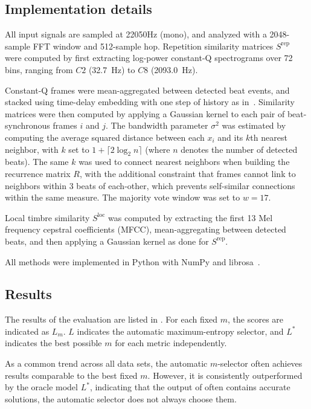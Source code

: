 \documentclass{article}
\begin{document}
\subsection{Implementation details}
All input signals are sampled at 22050Hz (mono), and analyzed with a 2048-sample FFT window
and 512-sample hop.  Repetition similarity matrices $S^\text{rep}$ were 
computed by first extracting log-power constant-Q spectrograms over 72 bins, ranging 
from $C2$ (32.7~Hz) to $C8$ (2093.0~Hz).

Constant-Q frames were mean-aggregated between detected beat events, and stacked using 
time-delay embedding with one step of history as in~\cite{serra2014unsupervised}.
Similarity matrices were then computed by applying a Gaussian kernel
to each pair of beat-synchronous frames $i$ and $j$.
The bandwidth parameter $\sigma^2$ was estimated by computing the average 
squared distance between each $x_i$ and its $k$th nearest neighbor, with 
$k$ set to $1 + \lceil 2\log_2 n\rceil$ (where $n$ denotes the number of detected beats).
The same $k$ was used to connect nearest neighbors when building the recurrence matrix $R$, 
with the additional constraint that frames cannot link to neighbors within 3 beats of each-other, which prevents
self-similar connections within the same measure. The majority vote window was set to
$w=17$.

Local timbre similarity $S^\text{loc}$ was computed by extracting the first 13 Mel
frequency cepstral coefficients (MFCC), mean-aggregating between detected beats, and
then applying a Gaussian kernel as done for $S^\text{rep}$.

All methods were implemented in Python with NumPy and 
librosa~\cite{van2011numpy, librosa}.

\subsection{Results}
The results of the evaluation are listed in
.  For each fixed $m$, 
the scores are indicated as $L_m$.  $L$ indicates the automatic
maximum-entropy selector, and $L^*$ indicates the best possible $m$ for each metric
independently.

As a common trend across all data sets, the automatic $m$-selector often achieves results
comparable to the best fixed $m$.  However, it is consistently outperformed by the 
oracle model $L^*$, indicating that the output of  often contains 
accurate solutions, the automatic selector does not always choose them.
\end{document}
